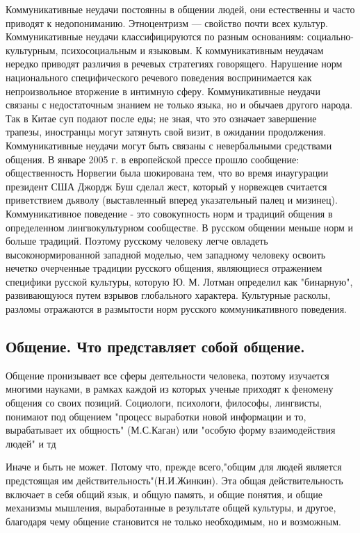 Коммуникативные неудачи постоянны в общении людей, они естественны и часто приводят к недопониманию.
Этноцентризм --- свойство почти всех культур. Коммуникативные неудачи классифицируются по разным основаниям: социально-культурным, психосоциальным и языковым. К коммуникативным неудачам нередко приводят различия в речевых стратегиях говорящего. Нарушение норм национального специфического речевого поведения воспринимается как непроизвольное вторжение в интимную сферу. Коммуникативные неудачи связаны с недостаточным знанием не только языка, но и обычаев другого народа. Так в Китае суп подают после еды; не зная, что это означает завершение трапезы, иностранцы могут затянуть свой визит, в ожидании продолжения. Коммуникативные неудачи могут быть связаны с невербальными средствами общения. В январе 2005 г. в европейской прессе прошло сообщение: общественность Норвегии была шокирована тем, что во время инаугурации президент США Джордж Буш сделал жест, который у норвежцев считается приветствием дьяволу (выставленный вперед указательный палец и мизинец). Коммуникативное поведение - это совокупность норм и традиций общения в определенном лингвокультурном сообществе.
В русском общении меньше норм и больше традиций.
Поэтому русскому человеку легче овладеть высоконормированной западной моделью, чем западному человеку освоить нечетко очерченные традиции русского общения, являющиеся отражением специфики русской культуры, которую Ю. М. Лотман определил как "бинарную", развивающуюся путем взрывов глобального характера. Культурные расколы, разломы отражаются в размытости норм русского коммуникативного поведения.

\subsection*{Общение. Что представляет собой общение.}
 

Общение пронизывает все сферы деятельности человека, поэтому изучается многими науками, в рамках каждой из
которых ученые приходят к феномену общения со своих позиций. Социологи, психологи, философы, лингвисты, понимают под
общением "процесс выработки новой информации и то, вырабатывает их
общность" (М.С.Каган) или "особую форму взаимодействия
людей" и тд

Иначе и быть не может. Потому что, прежде всего,"общим для людей является предстоящая им действительность"(Н.И.Жинкин). Эта общая действительность включает в себя  общий язык, и общую память, и общие понятия, и общие механизмы мышления, выработанные в результате общей культуры, и другое, благодаря чему общение становится не только необходимым, но и возможным.

